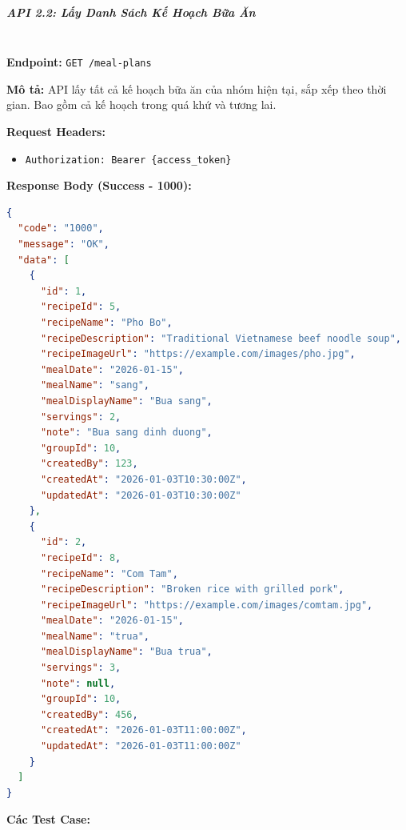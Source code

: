 \normalsize

\subparagraph{API 2.2: Lấy Danh Sách Kế Hoạch Bữa Ăn}~\\

\textbf{Endpoint:} \texttt{GET /meal-plans}

\textbf{Mô tả:} API lấy tất cả kế hoạch bữa ăn của nhóm hiện tại, sắp xếp theo thời gian. Bao gồm cả kế hoạch trong quá khứ và tương lai.

\textbf{Request Headers:}
\begin{itemize}
    \item \texttt{Authorization: Bearer \{access\_token\}}
\end{itemize}

\textbf{Response Body (Success - 1000):}

\begin{lstlisting}[language=json, caption=Response thanh cong API 2.2]
{
  "code": "1000",
  "message": "OK",
  "data": [
    {
      "id": 1,
      "recipeId": 5,
      "recipeName": "Pho Bo",
      "recipeDescription": "Traditional Vietnamese beef noodle soup",
      "recipeImageUrl": "https://example.com/images/pho.jpg",
      "mealDate": "2026-01-15",
      "mealName": "sang",
      "mealDisplayName": "Bua sang",
      "servings": 2,
      "note": "Bua sang dinh duong",
      "groupId": 10,
      "createdBy": 123,
      "createdAt": "2026-01-03T10:30:00Z",
      "updatedAt": "2026-01-03T10:30:00Z"
    },
    {
      "id": 2,
      "recipeId": 8,
      "recipeName": "Com Tam",
      "recipeDescription": "Broken rice with grilled pork",
      "recipeImageUrl": "https://example.com/images/comtam.jpg",
      "mealDate": "2026-01-15",
      "mealName": "trua",
      "mealDisplayName": "Bua trua",
      "servings": 3,
      "note": null,
      "groupId": 10,
      "createdBy": 456,
      "createdAt": "2026-01-03T11:00:00Z",
      "updatedAt": "2026-01-03T11:00:00Z"
    }
  ]
}
\end{lstlisting}

\textbf{Các Test Case:}

